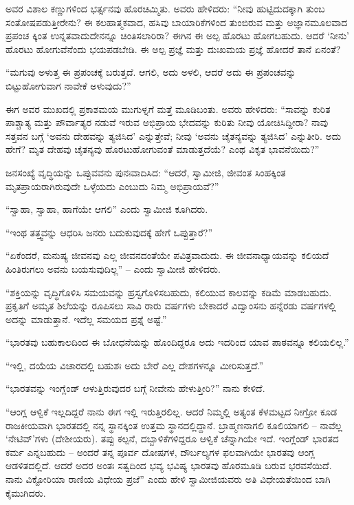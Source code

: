 ಅವರ ವಿಶಾಲ ಕಣ್ಣುಗಳಿಂದ ಭರ್ತ್ಸನವು ಹೊರಚಿಮ್ಮಿತು. ಅವರು ಹೇಳಿದರು: “ನೀವು ಹುಟ್ಟಿದುದಕ್ಕಾಗಿ ತುಂಬ ಸಂತೋಷಪಡುತ್ತೀರೇನು? ಈ ಕಲಹಾತ್ಮಕವಾದ, ಹಸಿವು ಬಾಯಾರಿಕೆಗಳಿಂದ ತುಂಬಿರುವ ಮತ್ತು ಅಜ್ಞಾನಮೂಲವಾದ ಪ್ರಪಂಚ ಕ್ಕಿಂತ ಉನ್ನತವಾದುದೇನನ್ನೂ ಚಿಂತಿಸಲಾರಿರಾ? ಈಗಿನ ಈ ಅಲ್ಪ ಹೊರಟು ಹೋಗಬಹುದು. ಆದರೆ ‘ನೀನು’ ಹೊರಟು ಹೋಗುವೆನೆಂದು ಭಯಪಡಬೇಡಿ. ಈ ಅಲ್ಪ ಪ್ರಜ್ಞೆ ಮತ್ತು ದುಃಖಮಯ ಪ್ರಜ್ಞೆ ಹೋದರೆ ತಾನೆ ಏನಂತೆ?

“ಮಗುವು ಅಳುತ್ತ ಈ ಪ್ರಪಂಚಕ್ಕೆ ಬರುತ್ತದೆ. ಆಗಲಿ, ಅದು ಅಳಲಿ, ಆದರೆ ಅದು ಈ ಪ್ರಪಂಚವನ್ನು ಬಿಟ್ಟುಹೋಗುವಾಗ ನಾವೇಕೆ ಅಳುವುದು?”

ಈಗ ಅವರ ಮುಖದಲ್ಲಿ ಪ್ರಕಾಶಮಯ ಮುಗುಳ್ನಗೆ ಮತ್ತೆ ಮೂಡಿಬಂತು. ಅವರು ಹೇಳಿದರು: “ಸಾವನ್ನು ಕುರಿತ ಪಾಶ್ಚಾತ್ಯ ಮತ್ತು ಪೌರ್ವಾತ್ಯರ ನಡುವೆ ಇರುವ ಅಭಿಪ್ರಾಯ ಭೇದವನ್ನು ಕುರಿತು ನೀವು ಯೋಚಿಸಿದ್ದೀರಾ? ನಾವು ಸತ್ತವನ ಬಗ್ಗೆ ‘ಅವನು ದೇಹವನ್ನು ತ್ಯಜಿಸಿದ’ ಎನ್ನುತ್ತೇವೆ; ನೀವು ‘ಅವನು ಚೈತನ್ಯವನ್ನು ತ್ಯಜಿಸಿದ’ ಎನ್ನುತೀರಿ. ಅದು ಹೇಗೆ? ಮೃತ ದೇಹವು ಚೈತನ್ಯವು ಹೊರಟುಹೋಗುವಂತೆ ಮಾಡುತ್ತದೆಯೆ? ಎಂಥ ವಿಕೃತ ಭಾವನೆಯಿದು?”

ಜನಸಂಖ್ಯೆ ವೃದ್ಧಿಯನ್ನು ಒಪ್ಪುವವನು ಪುನಃವಾದಿಸಿದ: “ಆದರೆ, ಸ್ವಾಮೀಜಿ, ಜೀವಂತ ಸಿಂಹಕ್ಕಿಂತ ಮೃತಪ್ರಾಯರಾಗಿರುವುದೇ ಒಳ್ಳೆಯದು ಎಂಬುದು ನಿಮ್ಮ ಅಭಿಪ್ರಾಯವೆ?”

“ಸ್ವಾಹಾ, ಸ್ವಾಹಾ, ಹಾಗೆಯೇ ಆಗಲಿ” ಎಂದು ಸ್ವಾಮೀಜಿ ಕೂಗಿದರು.

“ಇಂಥ ತತ್ತ್ವವನ್ನು ಆಧರಿಸಿ ಜನರು ಬದುಕುವುದಕ್ಕೆ ಹೇಗೆ ಒಪ್ಪುತ್ತಾರೆ?”

“ಏಕೆಂದರೆ, ಮನುಷ್ಯ ಜೀವನವು ಎಲ್ಲ ಜೀವನದಂತೆಯೇ ಪವಿತ್ರವಾದುದು. ಈ ಜೀವನಾಧ್ಯಾಯವನ್ನು ಕಲಿಯದೆ ಹಿಂತಿರುಗಲು ಅವನು ಬಯಸುವುದಿಲ್ಲ” – ಎಂದು ಸ್ವಾಮೀಜಿ ಹೇಳಿದರು.

“ಶಕ್ತಿಯನ್ನು ವೃದ್ಧಿಗೊಳಿಸಿ ಸಮಯವನ್ನು ಹ್ರಸ್ವಗೊಳಿಸಬಹುದು, ಕಲಿಯುವ ಕಾಲವನ್ನು ಕಡಿಮೆ ಮಾಡಬಹುದು. ಪ್ರಕೃತಿಗೆ ಅಮೃತ ಶಿಲೆಯನ್ನು ರೂಪಿಸಲು ಸಾವಿ ರಾರು ವರ್ಷಗಳು ಬೇಕಾದರೆ ವಿದ್ವಾಂಸನು ಹನ್ನೆರಡು ವರ್ಷಗಳಲ್ಲಿ ಅದನ್ನು ಮಾಡುತ್ತಾನೆ. ಇದೆಲ್ಲ ಸಮಯದ ಪ್ರಶ್ನೆ ಅಷ್ಟೆ.”

“ಭಾರತವು ಬಹುಕಾಲದಿಂದ ಈ ಬೋಧನೆಯನ್ನು ಹೊಂದಿದ್ದರೂ ಅದು ಇದರಿಂದ ಯಾವ ಪಾಠವನ್ನೂ ಕಲಿಯಲಿಲ್ಲ.”

“ಇಲ್ಲಿ, ದಯೆಯ ವಿಚಾರದಲ್ಲಿ ಬಹುಶಃ ಅದು ಬೇರೆ ಎಲ್ಲ ದೇಶಗಳನ್ನೂ ಮೀರಿಸುತ್ತದೆ.”

“ಭಾರತವನ್ನು ಇಂಗ್ಲೆಂಡ್ ಆಳುತ್ತಿರುವುದರ ಬಗ್ಗೆ ನೀವೇನು ಹೇಳುತ್ತೀರಿ?” ನಾನು ಕೇಳಿದೆ.

“ಆಂಗ್ಲ ಆಳ್ವಿಕೆ ಇಲ್ಲದಿದ್ದರೆ ನಾನು ಈಗ ಇಲ್ಲಿ ಇರುತ್ತಿರಲಿಲ್ಲ. ಆದರೆ ನಿಮ್ಮಲ್ಲಿ ಅತ್ಯಂತ ಕೆಳಮಟ್ಟದ ನೀಗ್ರೋ ಕೂಡ ರಾಜಕೀಯವಾಗಿ ಭಾರತದಲ್ಲಿ ನನ್ನ ಸ್ಥಾನಕ್ಕಿಂತ ಉತ್ತಮ ಸ್ಥಾನದಲ್ಲಿದ್ದಾನೆ. ಬ್ರಾಹ್ಮಣನಾಗಲಿ ಕೂಲಿಯಾಗಲಿ – ನಾವೆಲ್ಲ ‘ನೇಟಿವ್’ಗಳು (ದೇಶೀಯರು). ತಪ್ಪು ಕಲ್ಪನೆ, ದಬ್ಬಾಳಿಕೆಗಳಿದ್ದರೂ ಆಳ್ವಿಕೆ ಚೆನ್ನಾಗಿಯೇ ಇದೆ. ಇಂಗ್ಲೆಂಡ್ ಭಾರತದ ಕರ್ಮ ಎನ್ನಬಹುದು – ಅಂದರೆ ತನ್ನ ಪೂರ್ವ ದೋಷಗಳ, ದೌರ್ಬಲ್ಯಗಳ ಫಲವಾಗಿಯೇ ಭಾರತವು ಆಂಗ್ಲ ಆಡಳಿತದಲ್ಲಿದೆ. ಆದರೆ ಅದರ ಅಂತಃ ಸತ್ವದಿಂದ ಭವ್ಯ ಭವಿಷ್ಯ ಭಾರತವು ಹೊರಮೂಡಿ ಬರುವ ಭರವಸೆಯಿದೆ. ನಾನು ವಿಕ್ಟೋರಿಯಾ ರಾಣಿಯ ವಿಧೇಯ ಪ್ರಜೆ” ಎಂದು ಹೇಳಿ ಸ್ವಾಮೀಜಿಯವರು ಅತಿ ವಿಧೇಯತೆಯಿಂದ ಬಾಗಿ ಕೈಮುಗಿದರು.


